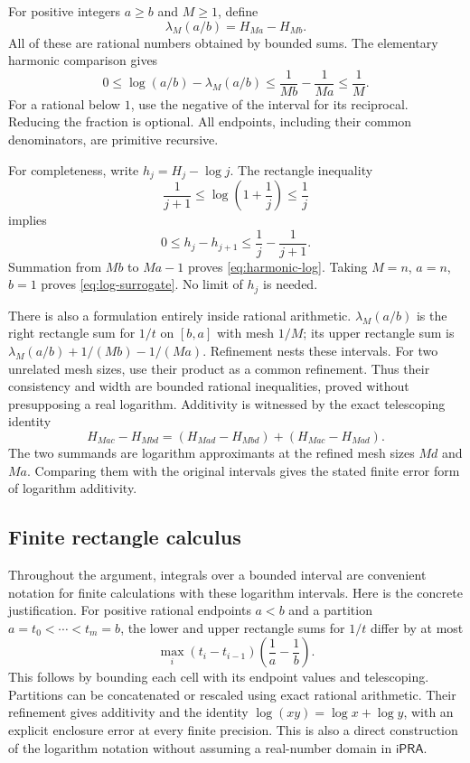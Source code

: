 \documentclass[11pt]{article}
\theoremstyle{definition}
\theoremstyle{remark}
\newcommand{\ipra}{\mathsf{iPRA}}
\begin{document}
For positive integers $a\ge b$ and $M\ge1$, define
\[
 \lambda_M(a/b)=H_{Ma}-H_{Mb}.
\]
All of these are rational numbers obtained by bounded sums. The elementary
harmonic comparison gives
\begin{equation}\label{eq:harmonic-log}
 0\le\log(a/b)-\lambda_M(a/b)
 \le \frac1{Mb}-\frac1{Ma}\le\frac1M.
\end{equation}
For a rational below $1$, use the negative of the interval for its reciprocal.
Reducing the fraction is optional. All endpoints, including their common
denominators, are primitive recursive.

For completeness, write $h_j=H_j-\log j$. The rectangle inequality
\[
 \frac1{j+1}\le\log\left(1+\frac1j\right)\le\frac1j
\]
implies
\[
 0\le h_j-h_{j+1}\le\frac1j-\frac1{j+1}.
\]
Summation from $Mb$ to $Ma-1$ proves \eqref{eq:harmonic-log}.
Taking $M=n$, $a=n$, $b=1$ proves \eqref{eq:log-surrogate}.
No limit of $h_j$ is needed.

There is also a formulation entirely inside rational arithmetic.
$\lambda_M(a/b)$ is the right rectangle sum for $1/t$ on $[b,a]$
with mesh $1/M$; its upper rectangle sum is
$\lambda_M(a/b)+1/(Mb)-1/(Ma)$. Refinement nests these intervals.
For two unrelated mesh sizes, use their product as a common refinement.
Thus their consistency and width are bounded rational inequalities,
proved without presupposing a real logarithm. Additivity is witnessed by
the exact telescoping identity
\[
 H_{Mac}-H_{Mbd}
 =(H_{Mad}-H_{Mbd})+(H_{Mac}-H_{Mad}).
\]
The two summands are logarithm approximants at the refined mesh sizes
$Md$ and $Ma$. Comparing them with the original intervals gives the
stated finite error form of logarithm additivity.

\subsection{Finite rectangle calculus}

Throughout the argument, integrals over a bounded interval are convenient
notation for finite calculations with these logarithm intervals. Here is
the concrete justification. For positive rational endpoints $a<b$ and a
partition $a=t_0<\cdots<t_m=b$, the lower and upper rectangle sums for
$1/t$ differ by at most
\[
 \max_i(t_i-t_{i-1})\left(\frac1a-\frac1b\right).
\]
This follows by bounding each cell with its endpoint values and telescoping.
Partitions can be concatenated or rescaled using exact rational arithmetic.
Their refinement gives additivity and the identity
$\log(xy)=\log x+\log y$, with an explicit enclosure error at every finite
precision. This is also a direct construction of the logarithm notation
without assuming a real-number domain in $\ipra$.
\end{document}
